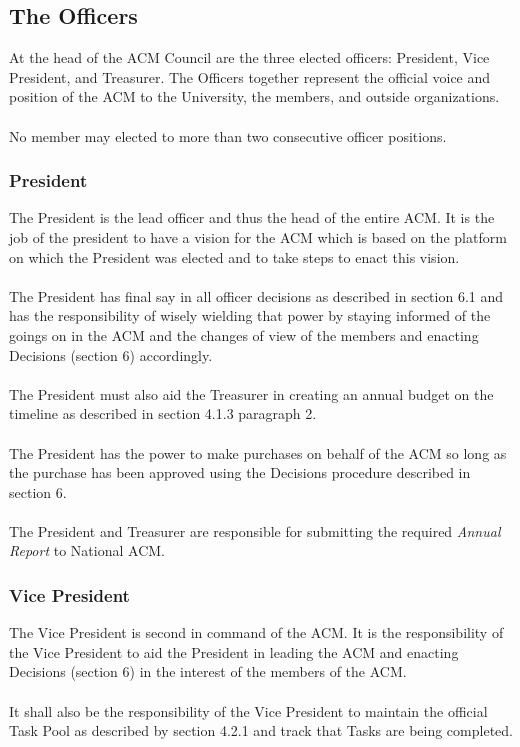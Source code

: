\documentclass[12pt,titlepage]{article}
\begin{document}
\subsection{The Officers}

At the head of the ACM Council are the three elected officers: President, Vice President, and Treasurer. The Officers together represent the official voice and position of the ACM to the University, the members, and outside organizations.\\
\\
No member may elected to more than two consecutive officer positions.

\subsubsection{President}

The President is the lead officer and thus the head of the entire ACM. It is the job of the president to have a vision for the ACM which is based on the platform on which the President was elected and to take steps to enact this vision.\\
\\
The President has final say in all officer decisions as described in section 6.1 and has the responsibility of wisely wielding that power by staying informed of the goings on in the ACM and the changes of view of the members and enacting Decisions (section 6) accordingly.\\
\\
The President must also aid the Treasurer in creating an annual budget on the timeline as described in section 4.1.3 paragraph 2.\\
\\
The President has the power to make purchases on behalf of the ACM so long as the purchase has been approved using the Decisions procedure described in section 6.\\
\\
The President and Treasurer are responsible for submitting the required \emph{Annual Report} to National ACM.

\subsubsection{Vice President}

The Vice President is second in command of the ACM. It is the responsibility of the Vice President to aid the President in leading the ACM and enacting Decisions (section 6) in the interest of the members of the ACM.\\
\\
It shall also be the responsibility of the Vice President to maintain the official Task Pool as described by section 4.2.1 and track that Tasks are being completed.
\end{document}
